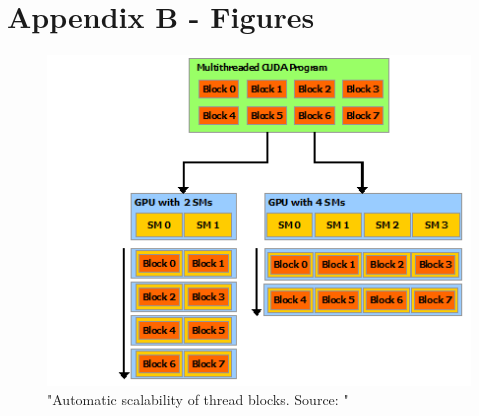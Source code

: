 \newpage
\section*{Appendix B - Figures}

\begin{figure}[ht]
\includegraphics[width=\textwidth]{Documents/Report/Figures/Automatic scalability.png}
\caption{"Automatic scalability of thread blocks. Source: \cite[Figure 3]{nvidia:cudadoc}"}
\label{fig:automatic scalability}
\end{figure}


